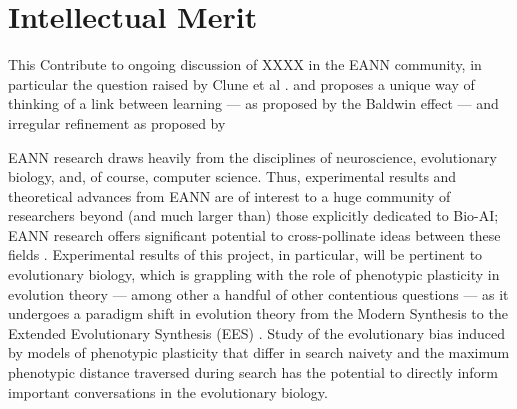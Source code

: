 \section{Intellectual Merit}
This Contribute to ongoing discussion of XXXX in the EANN community, in particular the question raised by Clune et al \cite{Clune2011OnRegularity}. and proposes a unique way of thinking of a link between learning --- as proposed by the Baldwin effect --- and irregular refinement as proposed by \cite{Clune2011OnRegularity}

EANN research draws heavily from the disciplines of neuroscience, evolutionary biology, and, of course, computer science. Thus, experimental results and theoretical advances from EANN are of interest to a huge community of researchers beyond (and much larger than) those explicitly dedicated to Bio-AI; EANN research offers significant potential to cross-pollinate ideas between these fields \cite{Pigliucci2008IsEvolvable, MoczekTheInnovation, MouretImportingGanglia}. Experimental results of this project, in particular, will be pertinent to evolutionary biology, which is grappling with the role of phenotypic plasticity in evolution theory --- among other a handful of other contentious questions --- as it undergoes a paradigm shift in evolution theory from the Modern Synthesis to the Extended Evolutionary Synthesis (EES) \cite{Pigliucci2008IsEvolvable}. Study of the evolutionary bias induced by models of phenotypic plasticity that differ in search naivety and the maximum phenotypic distance traversed during search has the potential to directly inform important conversations in the evolutionary biology. 

